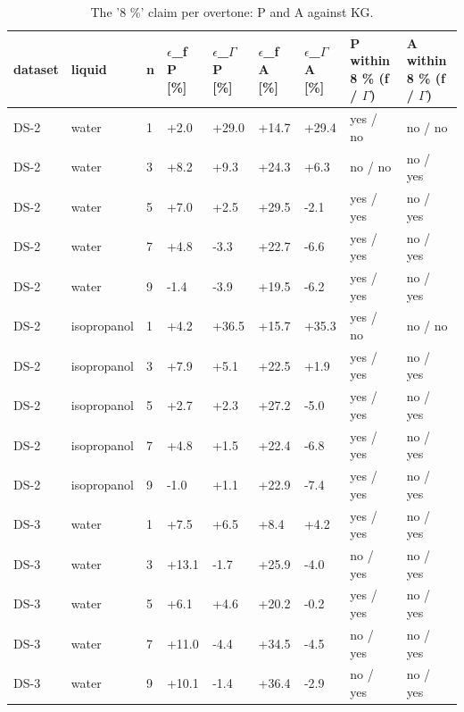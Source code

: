 \documentclass[11pt,a4paper]{article}
\begin{document}
\begin{landscape}{\scriptsize\setlength{\tabcolsep}{2pt}
\begin{longtable}{@{}lllllllll@{}}
\caption{The '8 \%' claim per overtone: P and A against KG.}\\
\toprule
dataset & liquid & n & $\epsilon$\_f P [\%] & $\epsilon$\_$\Gamma$ P [\%] & $\epsilon$\_f A [\%] & $\epsilon$\_$\Gamma$ A [\%] & P within 8 \% (f / $\Gamma$) & A within 8 \% (f / $\Gamma$) \\\midrule\endhead
DS-2 & water & 1 & +2.0 & +29.0 & +14.7 & +29.4 & yes / no & no / no \\
DS-2 & water & 3 & +8.2 & +9.3 & +24.3 & +6.3 & no / no & no / yes \\
DS-2 & water & 5 & +7.0 & +2.5 & +29.5 & -2.1 & yes / yes & no / yes \\
DS-2 & water & 7 & +4.8 & -3.3 & +22.7 & -6.6 & yes / yes & no / yes \\
DS-2 & water & 9 & -1.4 & -3.9 & +19.5 & -6.2 & yes / yes & no / yes \\
DS-2 & isopropanol & 1 & +4.2 & +36.5 & +15.7 & +35.3 & yes / no & no / no \\
DS-2 & isopropanol & 3 & +7.9 & +5.1 & +22.5 & +1.9 & yes / yes & no / yes \\
DS-2 & isopropanol & 5 & +2.7 & +2.3 & +27.2 & -5.0 & yes / yes & no / yes \\
DS-2 & isopropanol & 7 & +4.8 & +1.5 & +22.4 & -6.8 & yes / yes & no / yes \\
DS-2 & isopropanol & 9 & -1.0 & +1.1 & +22.9 & -7.4 & yes / yes & no / yes \\
DS-3 & water & 1 & +7.5 & +6.5 & +8.4 & +4.2 & yes / yes & no / yes \\
DS-3 & water & 3 & +13.1 & -1.7 & +25.9 & -4.0 & no / yes & no / yes \\
DS-3 & water & 5 & +6.1 & +4.6 & +20.2 & -0.2 & yes / yes & no / yes \\
DS-3 & water & 7 & +11.0 & -4.4 & +34.5 & -4.5 & no / yes & no / yes \\
DS-3 & water & 9 & +10.1 & -1.4 & +36.4 & -2.9 & no / yes & no / yes \\
\bottomrule
\end{longtable}}\end{landscape}
\end{document}
